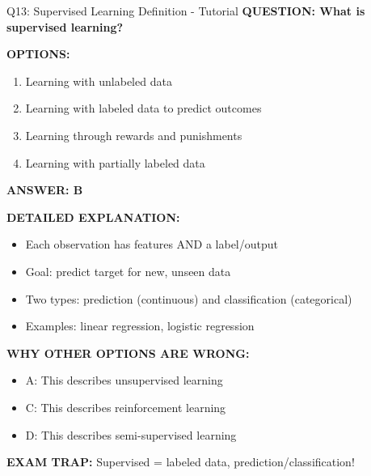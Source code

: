 \documentclass[8pt]{beamer}
\begin{document}
	\begin{frame}{Q13: Supervised Learning Definition - Tutorial}
		\fontsize{6.5}{7.5}\selectfont
		\textbf{QUESTION: What is supervised learning?}
		
		\vspace{0.1cm}
		\textbf{OPTIONS:}
		\begin{enumerate}
			\item Learning with unlabeled data
			\item Learning with labeled data to predict outcomes
			\item Learning through rewards and punishments
			\item Learning with partially labeled data
		\end{enumerate}
		
		\vspace{0.1cm}
		\textcolor{myblue}{\textbf{ANSWER: B}}
		
		\vspace{0.1cm}
		\textbf{DETAILED EXPLANATION:}
		\begin{itemize}
			\item Each observation has features AND a label/output
			\item Goal: predict target for new, unseen data
			\item Two types: prediction (continuous) and classification (categorical)
			\item Examples: linear regression, logistic regression
		\end{itemize}
		
		\vspace{0.1cm}
		\textcolor{myred}{\textbf{WHY OTHER OPTIONS ARE WRONG:}}
		\begin{itemize}
			\item \textcolor{myred}{A:} This describes unsupervised learning
			\item \textcolor{myred}{C:} This describes reinforcement learning
			\item \textcolor{myred}{D:} This describes semi-supervised learning
		\end{itemize}
		
		\textcolor{myred}{\textbf{EXAM TRAP:}} Supervised = \textcolor{myblue}{labeled data, prediction/classification}!
	\end{frame}
	
\end{document}
